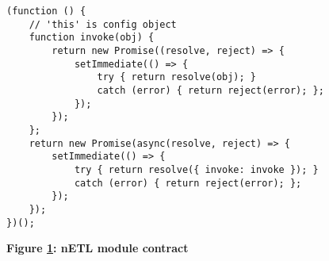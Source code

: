 \begin{figure}[H]
  \centering
  \begin{mdframed}
    \centering
    \begin{verbatim}
(function () {
    // 'this' is config object
    function invoke(obj) {
        return new Promise((resolve, reject) => {
            setImmediate(() => {
                try { return resolve(obj); }
                catch (error) { return reject(error); };
            });
        });
    };
    return new Promise(async(resolve, reject) => {
        setImmediate(() => {
            try { return resolve({ invoke: invoke }); }
            catch (error) { return reject(error); };
        });
    });
})();
        \end{verbatim}
  \end{mdframed}
  \caption[nETL module contract]{\textbf{Figure \ref{fig-module-contract}: nETL module contract}}
  \label{fig-module-contract}
\end{figure}